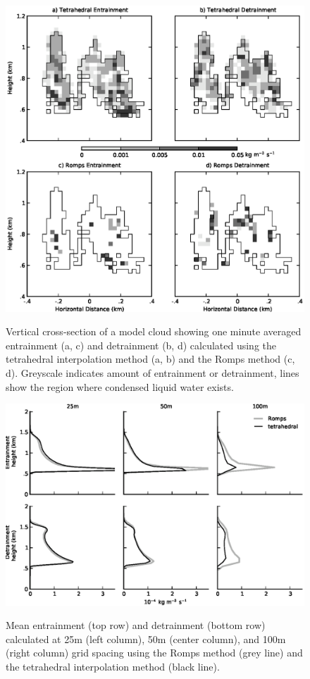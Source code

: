 \documentclass[12pt]{article}
\begin{document}
\begin{figure}[t]
  \noindent\includegraphics[width=39pc,angle=0]{./figures/spatial_variability_1min}\\ 
  \caption{Vertical cross-section of a model cloud showing one minute averaged 
  entrainment (a, c) and detrainment (b, d) calculated using the tetrahedral 
  interpolation method (a, b) and the Romps method (c, d).  Greyscale indicates 
  amount of entrainment or detrainment, lines show the region where condensed 
  liquid water exists.
  }
  \label{fig:spatial_variability}
\end{figure}

\begin{figure}[t]
  \noindent
  \includegraphics[width=39pc,angle=0]{./figures/resolution_dependence}\\
  \caption{Mean entrainment (top row) and detrainment (bottom row) calculated
  at 25m (left column), 50m (center column), and 100m (right column) grid 
  spacing using the Romps method (grey line) and the tetrahedral 
  interpolation method (black line).
  }
  \label{fig:resolution_dependence}
\end{figure}
\end{document}
